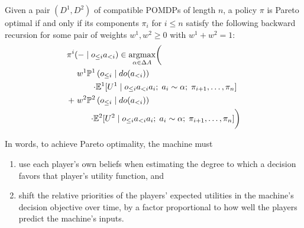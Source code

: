 \documentclass{article}
\newcommand{\hist}[1]{o_{\le #1}a_{<#1}}
\newcommand{\dohist}[1]{o_{\le #1} \mid do(a_{<#1})}
\DeclareMathOperator*{\argmax}{argmax}
\begin{document}
\begin{theorem}\label{thm:main}
Given a pair $(D^1,D^2)$ of compatible POMDPs of length $n$, a policy $\pi$ is Pareto optimal if and only if its components $\pi_i$ for $i\le n$ satisfy the following backward recursion for some pair of weights $w^1,w^2\geq 0$ with $w^1+w^2=1$:
\begin{align*}
\pi^i&(-\mid\hist{i}) \in \argmax_{\alpha\in\Delta A} \biggl(\vphantom{\left(\left(\right)\right)}\biggr.\\
 &\left.w^1 \PP^1\left(\dohist{i}\right)\right. \\ 
 & \quad \quad \left.\cdot \EE^1[U^1 \mid \hist{i} a_i ;\; a_i\sim \alpha;\; \pi_{i+1},\ldots,\pi_n]\right.\\
+ &\left.w^2 \PP^2\left(\dohist{i}\right)\right. \\ 
& \quad \quad \biggl.\cdot \EE^2[U^2 \mid \hist{i} a_i;\; a_i\sim \alpha;\; \pi_{i+1},\ldots,\pi_n] \biggr)
\end{align*}

In words, to achieve Pareto optimality, the machine must
\begin{enumerate}
\item use each player's own beliefs when estimating the degree to which a decision favors that player's utility function, and
\item shift the relative priorities of the players' expected utilities in the machine's decision objective over time, by a factor proportional to how well the players predict the machine's inputs.
\end{enumerate}
\end{theorem}
\end{document}
